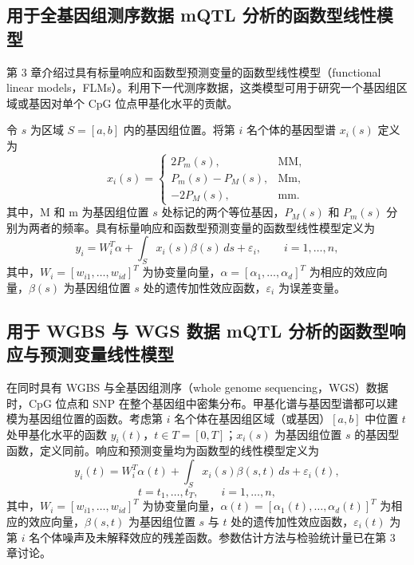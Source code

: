 \subsection{用于全基因组测序数据 mQTL 分析的函数型线性模型}

第 3 章介绍过具有标量响应和函数型预测变量的函数型线性模型（functional linear models，FLMs）。利用下一代测序数据，这类模型可用于研究一个基因组区域或基因对单个 CpG 位点甲基化水平的贡献。

令 $s$ 为区域 $S=[a,b]$ 内的基因组位置。将第 $i$ 名个体的基因型谱 $x_i(s)$ 定义为
\[
x_i(s)=\begin{cases}
2P_m(s),&\mathrm{MM},\\
P_m(s)-P_M(s),&\mathrm{Mm},\\
-2P_M(s),&\mathrm{mm}.
\end{cases}
\]
其中，M 和 m 为基因组位置 $s$ 处标记的两个等位基因，$P_M(s)$ 和 $P_m(s)$ 分别为两者的频率。具有标量响应和函数型预测变量的函数型线性模型定义为
\[
y_i=W_i^T\alpha+\int_Sx_i(s)\beta(s)\,ds+\varepsilon_i,\qquad i=1,\ldots,n,
\]
其中，$W_i=[w_{i1},\ldots,w_{id}]^T$ 为协变量向量，$\alpha=[\alpha_1,\ldots,\alpha_d]^T$ 为相应的效应向量，$\beta(s)$ 为基因组位置 $s$ 处的遗传加性效应函数，$\varepsilon_i$ 为误差变量。

\subsection{用于 WGBS 与 WGS 数据 mQTL 分析的函数型响应与预测变量线性模型}

在同时具有 WGBS 与全基因组测序（whole genome sequencing，WGS）数据时，CpG 位点和 SNP 在整个基因组中密集分布。甲基化谱与基因型谱都可以建模为基因组位置的函数。考虑第 $i$ 名个体在基因组区域（或基因）$[a,b]$ 中位置 $t$ 处甲基化水平的函数 $y_i(t)$，$t\in T=[0,T]$；$x_i(s)$ 为基因组位置 $s$ 的基因型函数，定义同前。响应和预测变量均为函数型的线性模型定义为
\[
y_i(t)=W_i^T\alpha(t)+\int_Sx_i(s)\beta(s,t)\,ds+\varepsilon_i(t),
\]
\[
t=t_1,\ldots,t_T,\qquad i=1,\ldots,n,
\]
其中，$W_i=[w_{i1},\ldots,w_{id}]^T$ 为协变量向量，$\alpha(t)=[\alpha_1(t),\ldots,\alpha_d(t)]^T$ 为相应的效应向量，$\beta(s,t)$ 为基因组位置 $s$ 与 $t$ 处的遗传加性效应函数，$\varepsilon_i(t)$ 为第 $i$ 名个体噪声及未解释效应的残差函数。参数估计方法与检验统计量已在第 3 章讨论。
